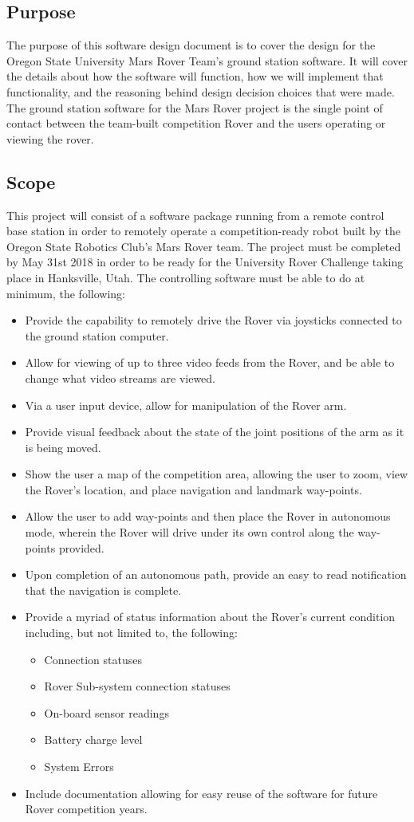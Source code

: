 \subsection{Purpose}
The purpose of this software design document is to cover the design for the Oregon State University Mars Rover Team's ground station software.
It will cover the details about how the software will function, how we will implement that functionality, and the reasoning behind design decision choices that were made.
The ground station software for the Mars Rover project is the single point of contact between the team-built competition Rover and the users operating or viewing the rover.


\subsection{Scope}
This project will consist of a software package running from a remote control base station in order to remotely operate a competition-ready robot built by the Oregon State Robotics Club's Mars Rover team.
The project must be completed by May 31st 2018 in order to be ready for the University Rover Challenge taking place in Hanksville, Utah.
The controlling software must be able to do at minimum, the following: 

\begin{itemize}
\item Provide the capability to remotely drive the Rover via joysticks connected to the ground station computer.
\item Allow for viewing of up to three video feeds from the Rover, and be able to change what video streams are viewed.
\item Via a user input device, allow for manipulation of the Rover arm.
\item Provide visual feedback about the state of the joint positions of the arm as it is being moved.
\item Show the user a map of the competition area, allowing the user to zoom, view the Rover's location, and place navigation and landmark way-points.
\item Allow the user to add way-points and then place the Rover in autonomous mode, wherein the Rover will drive under its own control along the way-points provided.
\item Upon completion of an autonomous path, provide an easy to read notification that the navigation is complete.
\item Provide a myriad of status information about the Rover's current condition including, but not limited to, the following:
  \begin{itemize}
  \item Connection statuses
  \item Rover Sub-system connection statuses
  \item On-board sensor readings
  \item Battery charge level
  \item System Errors
  \end{itemize}
\item Include documentation allowing for easy reuse of the software for future Rover competition years.
\end{itemize}


